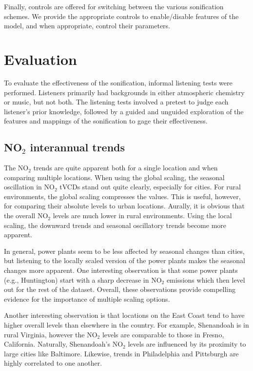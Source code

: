 \documentclass[a4paper,10pt,oneside]{article}
\newcommand{\ce}[1]{$\mathrm{#1}$}
\begin{document}
\begin{sloppy}
Finally, controls are offered for switching between the various sonification schemes. We provide the appropriate controls to enable/disable features of the model, and when appropriate, control their parameters.  

\section{Evaluation}

To evaluate the effectiveness of the sonification, informal listening tests were performed. Listeners primarily had backgrounds in either atmospheric chemistry or music, but not both. The listening tests involved a pretest to judge each listener's prior knowledge, followed by a guided and unguided exploration of the features and mappings of the sonification to gage their effectiveness.  

\subsection{NO$_2$ interannual trends}\label{sec:nox-trends-listening}
The \ce{NO_2} trends are quite apparent both for a single location and when comparing multiple locations.  When using the global scaling, the seasonal oscillation in \ce{NO_2} tVCDs stand out quite clearly, especially for cities. For rural environments, the global scaling compresses the values.  This is useful, however, for comparing their absolute levels to urban locations.  Aurally, it is obvious that the overall \ce{NO_2} levels are much lower in rural environments. Using the local scaling, the downward trends and seasonal oscillatory trends become more apparent. 

In general, power plants seem to be less affected by seasonal changes than cities, but listening to the locally scaled version of the power plants makes the seasonal changes more apparent. One interesting observation is that some power plants (e.g., Huntington) start with a sharp decrease in \ce{NO_2} emissions which then level out for the rest of the dataset. Overall, these observations provide compelling evidence for the importance of multiple scaling options.  

Another interesting observation is that locations on the East Coast tend to have higher overall levels than elsewhere in the country.  For example, Shenandoah is in rural Virginia, however the \ce{NO_2} levels are comparable to those in Fresno, California.  Naturally, Shenandoah's  \ce{NO_2} levels are influenced by its proximity to large cities like Baltimore. Likewise, trends in Philadelphia and Pittsburgh are highly correlated to one another.


\end{sloppy}
\end{document}

